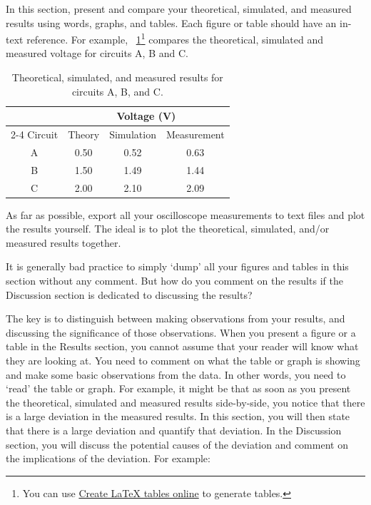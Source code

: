 \documentclass[a4paper, onecolumn, 12pt]{IEEEtran}
\begin{document}
In this section, present and compare your theoretical, simulated, and measured results using words, graphs, and tables. Each figure or table should have an in-text reference. For example, \tablename~\ref{tab:voltage_comp}\footnote{You can use \href{https://www.tablesgenerator.com}{Create LaTeX tables online} to generate tables.} compares the theoretical, simulated and measured voltage for circuits A, B and C. 

\begin{table}[htbp]
\centering
\caption{Theoretical, simulated, and measured results for circuits A, B, and C.}
\begin{tabular}{cccc}
\hline
        & \multicolumn{3}{c}{Voltage (V)}   \\ \cline{2-4} 
Circuit & Theory & Simulation & Measurement \\ \hline
A       & 0.50   & 0.52       & 0.63        \\
B       & 1.50   & 1.49       & 1.44        \\
C       & 2.00   & 2.10       & 2.09        \\ \hline
\end{tabular}
\label{tab:voltage_comp}
\end{table}

As far as possible, export all your oscilloscope measurements to text files and plot the results yourself. The ideal is to plot the theoretical, simulated, and/or measured results together.

It is generally bad practice to simply `dump' all your figures and tables in this section without any comment. But how do you comment on the results if the Discussion section is dedicated to discussing the results?

The key is to distinguish between making observations from your results, and discussing the significance of those observations. When you present a figure or a table in the Results section, you cannot assume that your reader will know what they are looking at. You need to comment on what the table or graph is showing and make some basic observations from the data. In other words, you need to `read' the table or graph. For example, it might be that as soon as you present the theoretical, simulated and measured results side-by-side, you notice that there is a large deviation in the measured results. In this section, you will then state that there is a large deviation and quantify that deviation. In the Discussion section, you will discuss the potential causes of the deviation and comment on the implications of the deviation. For example:
\end{document}
